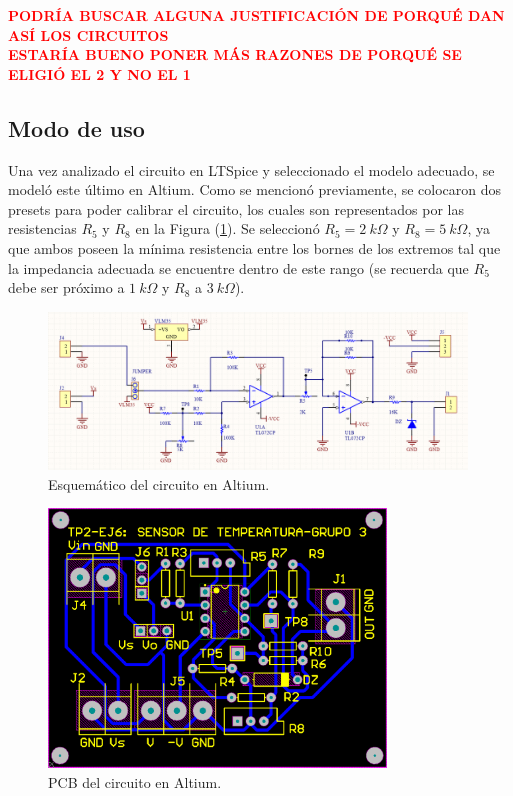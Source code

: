 \documentclass[a4paper]{article}
\begin{document}
\begin{center}
	\textcolor{red}{\textbf{PODRÍA BUSCAR ALGUNA JUSTIFICACIÓN DE PORQUÉ DAN ASÍ LOS CIRCUITOS}}\\
	\textcolor{red}{\textbf{ESTARÍA BUENO PONER MÁS RAZONES DE PORQUÉ SE ELIGIÓ EL 2 Y NO EL 1}}
\end{center}

\subsection{Modo de uso}

Una vez analizado el circuito en LTSpice y seleccionado el modelo adecuado, se modeló este último en Altium. Como se mencionó previamente, se colocaron dos presets para poder calibrar el circuito, los cuales son representados por las resistencias $R_5$ y $R_8$ en la Figura (\ref{fig:schematic}). Se seleccionó $R_5 = 2 \ k\Omega$ y $R_8 = 5 \ k\Omega$, ya que ambos poseen la mínima resistencia entre los bornes de los extremos tal que la impedancia adecuada se encuentre dentro de este rango (se recuerda que $R_5$ debe ser próximo a $ 1 \ k\Omega$ y $R_8$ a $ 3 \ k\Omega$).

\begin{figure}[H]
	\centering
	\includegraphics[width=0.99\textwidth]{Ejercicio6/Imagenes/Schematic.png}
	\caption{Esquemático del circuito en Altium.}
	\label{fig:schematic}
\end{figure}

\begin{figure}[H]
	\centering
	\includegraphics[width=0.8\textwidth]{Ejercicio6/Imagenes/PCB.png}
	\caption{PCB del circuito en Altium.}
	\label{fig:PCB}
\end{figure}
\end{document}
